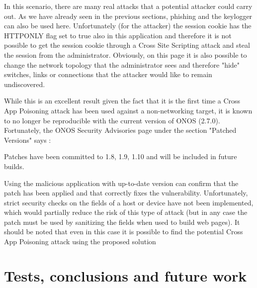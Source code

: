 \documentclass[a4paper,10pt]{memoir}
\begin{document}
In this scenario, there are many real attacks that a potential attacker could carry out. As we have already seen in the previous sections, phishing and the keylogger can also be used here. Unfortunately (for the attacker) the session cookie has the HTTPONLY flag set to true also in this application and therefore it is not possible to get the session cookie through a Cross Site Scripting attack and steal the session from the administrator. Obviously, on this page it is also possible to change the network topology that the administrator sees and therefore "hide" switches, links or connections that the attacker would like to remain undiscovered.
\medskip

While this is an excellent result given the fact that it is the first time a Cross App Poisoning attack has been used against a non-networking target, it is known to no longer be reproducible with the current version of ONOS (2.7.0). Fortunately, the ONOS Security Advisories page under the section "Patched Versions" says \cite{sec-adv-onos}:
\begin{quoting}[font=itshape, begintext={"}, endtext={"}]
Patches have been committed to 1.8, 1.9, 1.10 and will be included in future builds.
\end{quoting}

Using the malicious application with up-to-date version can confirm that the patch has been applied and that correctly fixes the vulnerability. Unfortunately, strict security checks on the fields of a host or device have not been implemented, which would partially reduce the risk of this type of attack (but in any case the patch must be used by sanitizing the fields when used to build web pages). It should be noted that even in this case it is possible to find the potential Cross App Poisoning attack using the proposed solution

\clearpage

\chapter{Tests, conclusions and future work}
\end{document}
